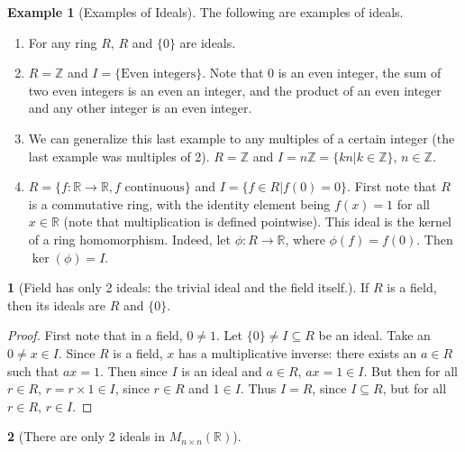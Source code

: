 \documentclass[12pt]{article}
\theoremstyle{definition}
\newtheorem{theorem}{\color{ForestGreen}{\textbf{Theorem}}}
\newcommand{\R}{\mathbb{R}}
\newcommand{\Z}{\mathbb{Z}}
\newtheorem{example}{\color{WildStrawberry}Example}
\theoremstyle{definition}
\begin{document}
\begin{example}[Examples of Ideals]
	The following are examples of ideals.
	\begin{enumerate}
		\item For any ring $R$, $R$ and $\{0\}$ are ideals.
		\item $R = \Z$ and $I = \{ \text{Even integers}\}$. Note that $0$ is an even integer, the sum of two even integers is an even an integer, and the product of an even integer and any other integer is an even integer.
		\item We can generalize this last example to any multiples of a certain integer (the last example was multiples of 2). $R = \Z$ and $I = n\Z = \{kn | k \in \Z \}$, $n \in \Z$.
		\item $R = \{f: \R \to \R, \text{$f$ continuous}\}$ and $I = \{f \in R |f(0) = 0\}$. First note that $R$ is a commutative ring, with the identity element being $f(x) =  1$ for all $x \in \R$ (note that multiplication is defined pointwise). This ideal is the kernel of a ring homomorphism. Indeed, let $\phi: R \to \R$, where $\phi(f) = f(0)$. Then $\ker(\phi) = I$.
	\end{enumerate}
\end{example}

\begin{theorem}[Field has only 2 ideals: the trivial ideal and the field itself.]
	If $R$ is a field, then its ideals are $R$ and $\{0\}$.
\end{theorem}
\begin{proof}
	First note that in a field, $0 \neq 1$. Let $\{0\} \neq I \subseteq R$ be an ideal. Take an $0 \neq x \in I$. Since $R$ is a field, $x$ has a multiplicative inverse: there exists an $a \in R$ such that $ax = 1$. Then since $I$ is an ideal and $a \in R$, $ax = 1 \in I$. But then for all $r \in R$, $r = r\times 1 \in I$, since $r \in R$ and $1 \in I$. Thus $I = R$, since $I \subseteq R$, but for all $r \in R$, $r \in I$.
\end{proof}

\begin{theorem}[There are only 2 ideals in $M_{n\times n}(\R)$]
\end{theorem}
\end{document}
